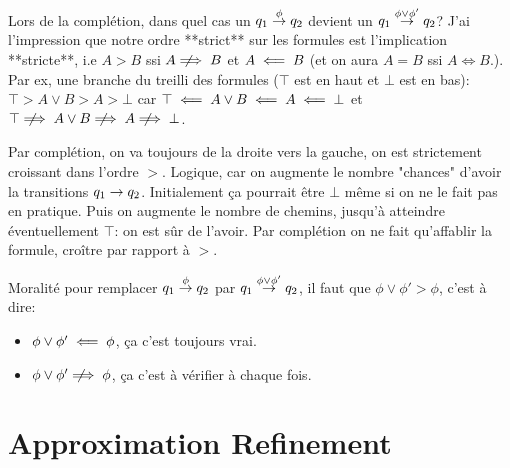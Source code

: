 \documentclass{fsttcs}
\begin{document}

Lors de la complétion, dans quel cas un $q_1 \stackrel{\phi}{\rightarrow} q_2$
devient un $q_1 \stackrel{\phi \vee \phi'}{\rightarrow} q_2$? J'ai l'impression que notre ordre
**strict** sur les formules est l'implication **stricte**, i.e 
$A > B$ ssi $A \; \mathrel{\not\hspace*{-1mm}\Longrightarrow} \; B$ et $A \; \Longleftarrow \; B$ (et on aura $A=B$ ssi $A \Leftrightarrow B$.).
Par ex, une branche du treilli des formules ($\top$ est en haut et $\bot$ est en bas):
$\top > A \vee B > A > \bot$
car $\top  \; \Longleftarrow \;  A \vee B  \; \Longleftarrow \; A  \; \Longleftarrow \;  \bot$ et $\top  \; \mathrel{\not\hspace*{-1mm}\Longrightarrow} \; A \vee  B
\; \mathrel{\not\hspace*{-1mm}\Longrightarrow} \; A \; \mathrel{\not\hspace*{-1mm}\Longrightarrow} \; \bot$.

Par complétion, on va toujours de la droite vers la gauche, on est strictement
croissant dans l'ordre $>$. Logique, car on augmente le nombre "chances"  d'avoir
la transitions $q_1 \rightarrow q_2$. Initialement ça pourrait être $\bot$ même si on ne le
fait pas en pratique. Puis on augmente le nombre de chemins, jusqu'à atteindre
éventuellement $\top$: on est sûr de l'avoir. Par complétion on ne fait qu'affablir
la formule, croître par rapport à $>$. 

Moralité pour remplacer $q_1 \stackrel{\phi}{\rightarrow} q_2$ par $q_1 \stackrel{\phi \vee \phi'}{\rightarrow}
q_2$, il faut que $\phi \vee \phi' > \phi$, c'est à dire:
\begin{itemize}
\item $\phi \vee \phi' \; \Longleftarrow \; \phi$, ça c'est toujours vrai.
\item $\phi \vee \phi' \; \mathrel{\not\hspace*{-1mm}\Longrightarrow} \; \phi$, ça c'est à vérifier à chaque fois.
\end{itemize}


\section{Approximation Refinement}
\label{sec:refinement}

\end{document}
